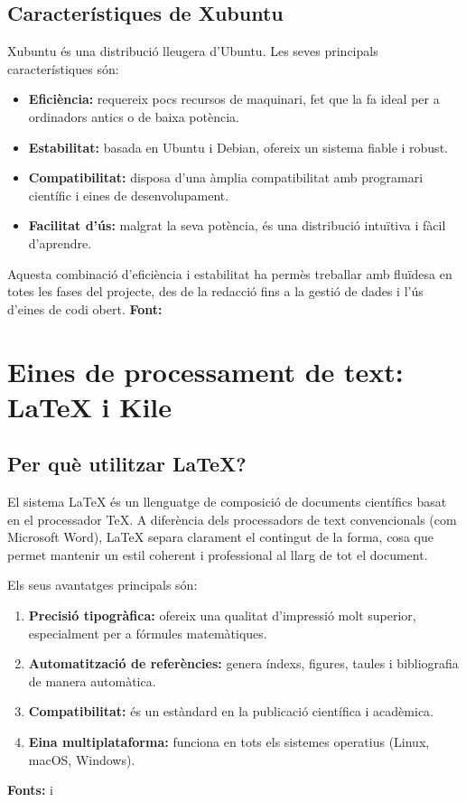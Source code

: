 \subsection{Característiques de Xubuntu}
Xubuntu és una distribució lleugera d’Ubuntu.  Les seves principals característiques són:
\begin{itemize}
  \item \textbf{Eficiència:} requereix pocs recursos de maquinari, fet que la fa ideal per a ordinadors antics o de baixa potència.
  \item \textbf{Estabilitat:} basada en Ubuntu i Debian, ofereix un sistema fiable i robust.
  \item \textbf{Compatibilitat:} disposa d’una àmplia compatibilitat amb programari científic i eines de desenvolupament.
  \item \textbf{Facilitat d’ús:} malgrat la seva potència, és una distribució intuïtiva i fàcil d’aprendre.
\end{itemize}

Aquesta combinació d’eficiència i estabilitat ha permès treballar amb fluïdesa en totes les fases del projecte, des de la redacció fins a la gestió de dades i l’ús d’eines de codi obert.
\textbf{Font:} \cite{A3}
\section{Eines de processament de text: LaTeX i Kile}
\subsection{Per què utilitzar LaTeX?}
El sistema LaTeX és un llenguatge de composició de documents científics basat en el processador TeX. A diferència dels processadors de text convencionals (com Microsoft Word), LaTeX separa clarament el contingut de la forma, cosa que permet mantenir un estil coherent i professional al llarg de tot el document.

Els seus avantatges principals són:
\begin{enumerate}
  \item \textbf{Precisió tipogràfica:} ofereix una qualitat d’impressió molt superior, especialment per a fórmules matemàtiques.
  \item \textbf{Automatització de referències:} genera índexs, figures, taules i bibliografia de manera automàtica.
  \item \textbf{Compatibilitat:} és un estàndard en la publicació científica i acadèmica.
  \item \textbf{Eina multiplataforma:} funciona en tots els sistemes operatius (Linux, macOS, Windows).
\end{enumerate}
\textbf{Fonts:} \cite{A4} i~\cite{LaTeX}
